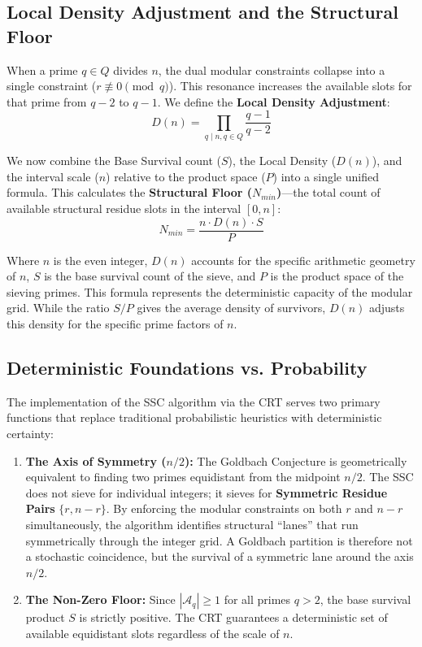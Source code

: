 \documentclass[twoside,9pt]{extarticle}
\begin{document}
\subsection{Local Density Adjustment and the Structural Floor}
\label{subsec:local_density}

When a prime $q \in Q$ divides $n$, the dual modular constraints collapse into a single constraint ($r \not\equiv 0 \pmod{q}$). This resonance increases the available slots for that prime from $q-2$ to $q-1$. We define the \textbf{Local Density Adjustment}:
\begin{equation}
D(n) = \prod_{q \mid n, q \in Q} \frac{q - 1}{q - 2}
\end{equation}

We now combine the Base Survival count ($S$), the Local Density ($D(n)$), and the interval scale ($n$) relative to the product space ($P$) into a single unified formula. This calculates the \textbf{Structural Floor ($N_{min}$)}—the total count of available structural residue slots in the interval $[0, n]$:
\begin{equation}
\label{eq:structural_floor}
N_{min} = \frac{n \cdot D(n) \cdot S}{P}
\end{equation}

Where $n$ is the even integer, $D(n)$ accounts for the specific arithmetic geometry of $n$, $S$ is the base survival count of the sieve, and $P$ is the product space of the sieving primes. This formula represents the deterministic capacity of the modular grid. While the ratio $S/P$ gives the average density of survivors, $D(n)$ adjusts this density for the specific prime factors of $n$.

\subsection{Deterministic Foundations vs. Probability}
\label{subsec:determinism}

The implementation of the SSC algorithm via the CRT serves two primary functions that replace traditional probabilistic heuristics with deterministic certainty:
\begin{enumerate}
    \item \textbf{The Axis of Symmetry ($n/2$):} The Goldbach Conjecture is geometrically equivalent to finding two primes equidistant from the midpoint $n/2$. The SSC does not sieve for individual integers; it sieves for \textbf{Symmetric Residue Pairs} $\{r, n-r\}$. By enforcing the modular constraints on both $r$ and $n-r$ simultaneously, the algorithm identifies structural ``lanes'' that run symmetrically through the integer grid. A Goldbach partition is therefore not a stochastic coincidence, but the survival of a symmetric lane around the axis $n/2$.
    
    \item \textbf{The Non-Zero Floor:} Since $|\mathcal{A}_q| \ge 1$ for all primes $q > 2$, the base survival product $S$ is strictly positive. The CRT guarantees a deterministic set of available equidistant slots regardless of the scale of $n$.
\end{enumerate}
\end{document}
